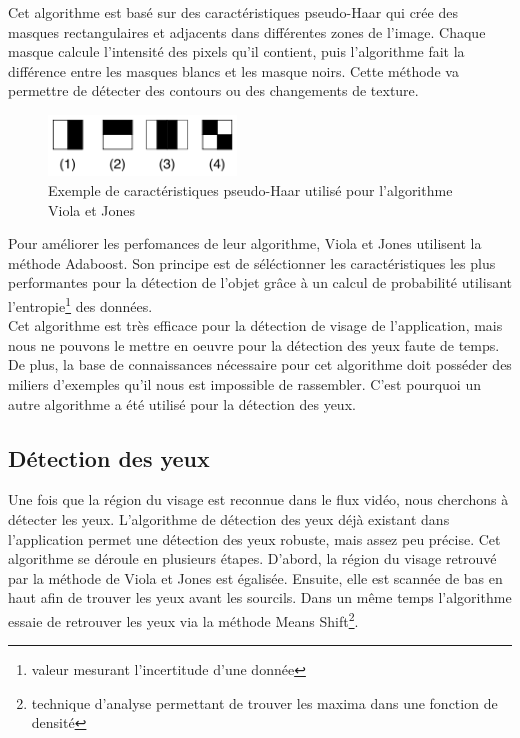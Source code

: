 Cet algorithme est basé sur des caractéristiques pseudo-Haar qui crée des masques rectangulaires et adjacents
dans différentes zones de l'image. Chaque masque calcule l'intensité des pixels qu'il contient, puis l'algorithme fait
la différence entre les masques blancs et les masque noirs. Cette méthode va permettre de détecter des contours ou des changements de 
texture.\\

\begin{figure}[H]
\center
\includegraphics[width=5cm]{image/pseudo_haar.png}
\caption{Exemple de caractéristiques pseudo-Haar utilisé pour l'algorithme Viola et Jones}
\end{figure}

Pour améliorer les perfomances de leur algorithme, Viola et Jones utilisent la méthode Adaboost. Son
principe est de séléctionner les caractéristiques les plus performantes pour la détection de l'objet grâce à
un calcul de probabilité utilisant l'entropie\footnote{valeur mesurant l'incertitude d'une donnée} des données.\\

Cet algorithme est très efficace pour la détection de visage de l'application, mais nous ne pouvons le mettre
en oeuvre pour la détection des yeux faute de temps. De plus, la base de connaissances nécessaire pour cet 
algorithme doit posséder des miliers d'exemples qu'il nous est impossible de rassembler. C'est pourquoi
un autre algorithme a été utilisé pour la détection des yeux.

\subsection{Détection des yeux}
Une fois que la région du visage est reconnue dans le flux vidéo, nous cherchons à détecter les yeux. 
L'algorithme de détection des yeux déjà existant dans l'application permet une détection des yeux 
robuste, mais assez peu précise. Cet algorithme se déroule en plusieurs étapes. D'abord, la région du visage 
retrouvé par la méthode de Viola et Jones est égalisée. Ensuite, elle est scannée de bas en haut afin de
trouver les yeux avant les sourcils. Dans un même temps l'algorithme essaie de retrouver les yeux via la
méthode Means Shift\footnote{technique d'analyse permettant de trouver les maxima dans une fonction de densité}.\\



